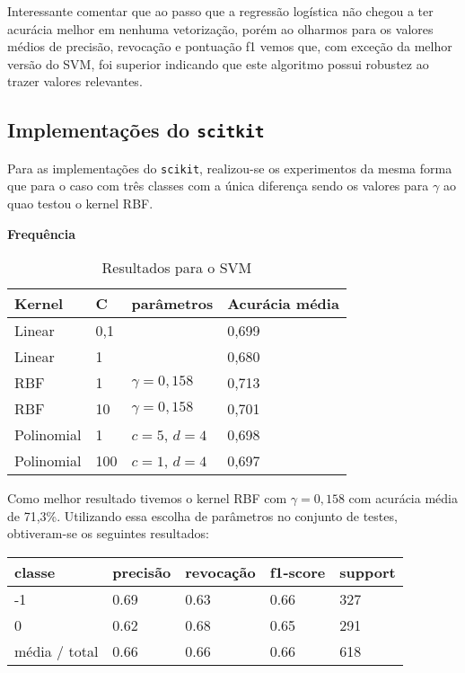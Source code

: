 Interessante comentar que ao passo que a regressão logística não chegou a ter
acurácia melhor em nenhuma vetorização, porém ao olharmos para os valores médios de precisão,
revocação e pontuação f1 vemos que, com exceção da melhor versão do SVM, foi superior indicando
que este algoritmo possui robustez ao trazer valores relevantes.

\subsection{Implementações do \texttt{scitkit}}

Para as implementações do \texttt{scikit}, realizou-se os experimentos da mesma forma que
para o caso com três classes com a única diferença sendo os valores para $\gamma$ ao quao
testou o kernel RBF.

\textbf{Frequência}

\begin{table}[H]
	\centering
	\caption{Resultados para o SVM}
	\begin{tabular}{l l l l}
		\hline
		Kernel & C & parâmetros & Acurácia média \\
		\hline
		Linear & 0,1 & & 0,699 \\
		\hline
		Linear & 1 & & 0,680 \\
		\hline
		RBF & 1 & $\gamma = 0,158$ & 0,713 \\
		\hline
		RBF & 10 & $\gamma = 0,158$ & 0,701 \\
		\hline
		Polinomial & 1 & $c = 5$, $d = 4$ & 0,698 \\
		\hline
		Polinomial & 100 & $c = 1$, $d = 4$ & 0,697 \\
		\hline
	\end{tabular}
\end{table}

Como melhor resultado tivemos o kernel RBF com $\gamma = 0,158$ com acurácia média
de 71,3\%. Utilizando essa escolha de parâmetros no conjunto de testes, obtiveram-se
os seguintes resultados:

\begin{table}[H]
	\centering
		\begin{tabular}{l | l | l | l | l}
		\hline
		classe  	&	precisão  &  revocação &  f1-score &  support \\
		\hline
		 -1    &   0.69   &   0.63   &   0.66   &    327 \\
		 \hline
          0    &   0.62   &   0.68   &   0.65   &    291 \\
		\hline
		média / total   &    0.66   &   0.66   &   0.66   &    618 \\
		\hline
	\end{tabular}
\end{table}

